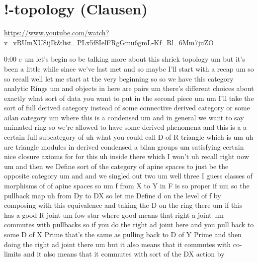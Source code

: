 
\section{\ufs !-topology (Clausen)}

\url{https://www.youtube.com/watch?v=vRUmXU8ijIk&list=PLx5f8IelFRgGmu6gmL-Kf_Rl_6Mm7juZO}
\renewcommand{\yt}[2]{\href{https://www.youtube.com/watch?v=vRUmXU8ijIk&list=PLx5f8IelFRgGmu6gmL-Kf_Rl_6Mm7juZO&t=#1}{#2}}
\vspace{1em}

\begin{unfinished}{0:00}
  e  um  let's  begin
so  be  talking  more  about  this  shriek
topology  um  but  it's  been  a  little  while
since  we've  last  met  and  so  maybe  I'll
start  with  a
recap  um
so  so
recall  well  let  me  start  at  the  very
beginning  so  so  we  have  this  category
analytic
Rings  um
and  objects  in  here  are
pairs
um  there's  different  choices  about
exactly  what  sort  of  data  you  want  to
put  in  the  second  piece
um  um  I'll  take  the  sort  of  full  derived
category  instead  of  some  connective
derived  category  or  some  ailan  category
um  where  this  is  a
condensed  um  and  in  general  we  want  to
say  animated  ring  so  we're  allowed  to
have  some  derived
phenomena  and  this  is  a  a  certain  full
subcategory
of  uh  what  you  could  call  D  of  R
triangle  which  is
um
uh  are  triangle  modules  in  derived
condensed  a  bilan  groups
um  satisfying
certain  nice  closure  axioms  for  for  this
uh  inside  there  which  I  won't  uh  recall
right
now
um  and  then  we  Define  sort  of  the
category  of  apine  spaces  to  just  be  the
opposite
category
um  and
and  we  singled  out  two
um  well  three  I  guess  classes  of
morphisms  of  of  apine  spaces  so
um  f  from  X  to  Y  in
F
is  so
proper
if  um  so  the  pullback  map
uh  from  Dy  to  DX  so  let  me  Define  d  on
the  level  of  f  by  composing  with  this
equivalence  and  taking  the  D  on  the  ring
there  um  if  this  has  a  good  R
joint  um  fow  star  where  good  means  that
right  a  joint
um  commutes  with  pullbacks  so  if  you  do
the  right  ad  joint  here  and  you  pull
back  to  some  D  of  X  Prime  that's  the
same  as  pulling  back  to  D  of  Y  Prime  and
then  doing  the  right  ad  joint  there  um
but  it  also  means  that  it  commutes  with
co-  limits  and  it  also  means  that  it
commutes  with  sort  of  the  DX  action  by

\end{unfinished}
